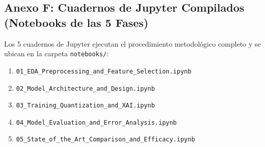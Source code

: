 \subsection{Anexo F: Cuadernos de Jupyter Compilados (Notebooks de las 5 Fases)}
Los 5 cuadernos de Jupyter ejecutan el procedimiento metodológico completo y se ubican en la carpeta \texttt{notebooks/}:
\begin{enumerate}
    \item \texttt{01\_EDA\_Preprocessing\_and\_Feature\_Selection.ipynb}
    \item \texttt{02\_Model\_Architecture\_and\_Design.ipynb}
    \item \texttt{03\_Training\_Quantization\_and\_XAI.ipynb}
    \item \texttt{04\_Model\_Evaluation\_and\_Error\_Analysis.ipynb}
    \item \texttt{05\_State\_of\_the\_Art\_Comparison\_and\_Efficacy.ipynb}
\end{enumerate}
